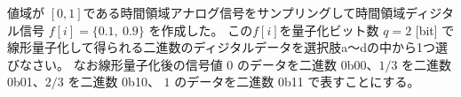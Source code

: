 値域が $[0,1]$である時間領域アナログ信号をサンプリングして時間領域ディジタル信号 $f[i] = \{0.1,\ 0.9 \}$ を作成した。
この$f[i]$を量子化ビット数 $q = 2$ [bit] で線形量子化して得られる二進数のディジタルデータを選択肢a〜dの中から1つ選びなさい。
なお線形量子化後の信号値 $0$ のデータを二進数 0b00、$1/3$ を二進数 0b01、$2/3$ を二進数 0b10、 $1$ のデータを二進数 0b11 で表すことにする。
